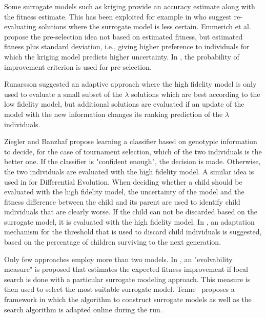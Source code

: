 Some surrogate models such as kriging provide an accuracy estimate along with the fitness estimate. This has been exploited for example in \cite{BeKe01,BrSc05} who suggest re-evaluating solutions where the surrogate model is less certain. Emmerich et al.\cite{Emmerich2002} propose the pre-selection idea not based on estimated fitness, but estimated fitness plus standard deviation, i.e., giving higher preference to individuals for which the kriging model predicts higher uncertainty. In \cite{Zhou2007}, the probability of improvement criterion is used for pre-selection.

Runarsson \cite{Runarsson04} suggested an adaptive approach where the high fidelity model is only used to evaluate a small subset of the $\lambda$ solutions which are best according to the low fidelity model, but additional solutions are evaluated if an update of the model with the new information changes its ranking prediction of the $\lambda$ individuals.

Ziegler and Banzhaf\cite{ZiBa03} propose learning a classifier based on genotypic information to decide, for the case of tournament selection, which of the two individuals is the better one. If the classifier is "confident enough", the decision is made. Otherwise, the two individuals are evaluated with the high fidelity model. A similar idea is used in \cite{TaSa08} for Differential Evolution. When deciding whether a child should be evaluated with the high fidelity model, the uncertainty of the model and the fitness difference between the child and its parent are used to identify child individuals that are clearly worse. If the child can not be discarded based on the surrogate model, it is evaluated with the high fidelity model. In \cite{TaSa10}, an adaptation mechanism for the threshold that is used to discard child individuals is suggested, based on the percentage of children surviving to the next generation. 

Only few approaches employ more than two models. 
In \cite{Le2013}, an "evolvability measure" is proposed that estimates the expected fitness improvement if local search is done with a particular surrogate modeling approach. This measure is then used to select the most suitable surrogate model. Tenne~\cite{Tenne2013} proposes a framework in which the algorithm to construct surrogate models as well as the search algorithm is adapted online during the run.

